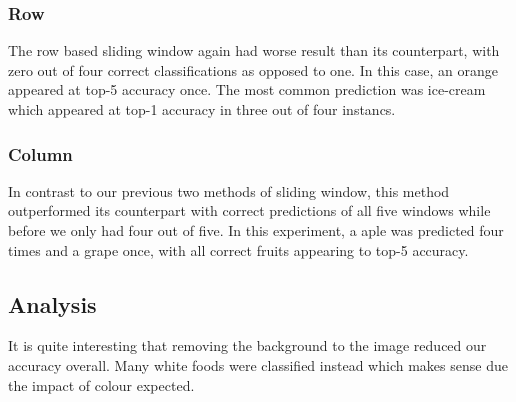 \subsubsection*{Row}
The row based sliding window again had worse result than its counterpart, with
zero out of four correct classifications as opposed to one. In this case, an
orange appeared at top-5 accuracy once. The most common prediction was ice-cream
which appeared at top-1 accuracy in three out of four instancs.

\subsubsection*{Column}
In contrast to our previous two methods of sliding window, this method
outperformed its counterpart with correct predictions of all five windows while
before we only had four out of five. In this experiment, a aple was predicted
four times and a grape once, with all correct fruits appearing to top-5
accuracy.

\subsection*{Analysis}
It is quite interesting that removing the background to the image reduced our
accuracy overall. Many white foods were classified instead which makes sense due
the impact of colour expected.
